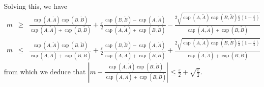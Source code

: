 \documentclass[english, aip, jcp, priprint, graphicx,floatfix]{revtex4-1}
\newcommand{\tmop}[1]{\ensuremath{\operatorname{#1}}}
\theoremstyle{plain}
\theoremstyle{definition}
\theoremstyle{plain}
\begin{document}
Solving this, we have
\begin{eqnarray*}
m & \geqslant & \frac{\tmop{cap} (A, \tilde{A}) \tmop{cap} (B,
\tilde{B})}{\tmop{cap} (A, \tilde{A}) + \tmop{cap} (B, \tilde{B})} +
\frac{\varepsilon}{2} \frac{\tmop{cap} (B, \tilde{B}) - \tmop{cap} (A,
\tilde{A})}{\tmop{cap} (A, \tilde{A}) + \tmop{cap} (B, \tilde{B})} - \frac{2
\sqrt{\tmop{cap} (A, \tilde{A}) \tmop{cap} (B, \tilde{B})
\frac{\varepsilon}{2} \left( 1 - \frac{\varepsilon}{2} \right)}}{\tmop{cap}
(A, \tilde{A}) + \tmop{cap} (B, \tilde{B})}\\
m & \leqslant & \frac{\tmop{cap} (A, \tilde{A}) \tmop{cap} (B,
\tilde{B})}{\tmop{cap} (A, \tilde{A}) + \tmop{cap} (B, \tilde{B})} +
\frac{\varepsilon}{2} \frac{\tmop{cap} (B, \tilde{B}) - \tmop{cap} (A,
\tilde{A})}{\tmop{cap} (A, \tilde{A}) + \tmop{cap} (B, \tilde{B})} + \frac{2
\sqrt{\tmop{cap} (A, \tilde{A}) \tmop{cap} (B, \tilde{B})
\frac{\varepsilon}{2} \left( 1 - \frac{\varepsilon}{2} \right)}}{\tmop{cap}
(A, \tilde{A}) + \tmop{cap} (B, \tilde{B})}
\end{eqnarray*}
from which we deduce that $\left| m - \frac{\tmop{cap} (A, \tilde{A}) \tmop{cap} (B, \tilde{B})}{\tmop{cap} (A, \tilde{A}) + \tmop{cap} (B, \tilde{B})} \right| \leqslant \frac{\varepsilon}{2} + \sqrt{\frac{\varepsilon}{2}}$.
\end{document}
